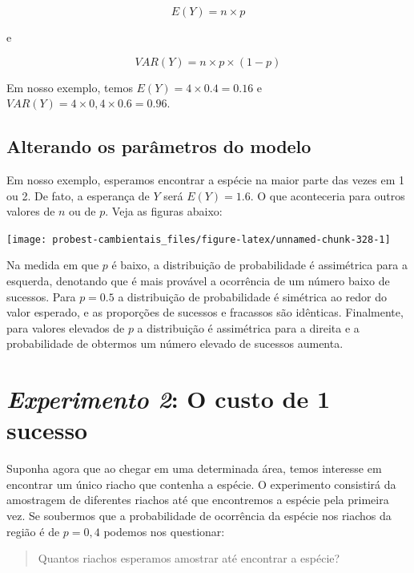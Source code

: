 \documentclass[
]{book}
\begin{document}
\[E(Y) = n \times p\]

e

\[VAR(Y) = n \times p \times (1-p)\]

Em nosso exemplo, temos \(E(Y) = 4 \times 0.4 = 0.16\) e \(VAR(Y) = 4 \times 0,4 \times 0.6 = 0.96\).

\hypertarget{alterando-os-paruxe2metros-do-modelo}{%
\subsection*{Alterando os parâmetros do modelo}\label{alterando-os-paruxe2metros-do-modelo}}

Em nosso exemplo, esperamos encontrar a espécie na maior parte das vezes em 1 ou 2. De fato, a esperança de \(Y\) será \(E(Y) = 1.6\). O que aconteceria para outros valores de \(n\) ou de \(p\). Veja as figuras abaixo:

\begin{center}\texttt{[image: probest-cambientais\_files/figure-latex/unnamed-chunk-328-1]} \end{center}

Na medida em que \(p\) é baixo, a distribuição de probabilidade é assimétrica para a esquerda, denotando que é mais provável a ocorrência de um número baixo de sucessos. Para \(p = 0.5\) a distribuição de probabilidade é simétrica ao redor do valor esperado, e as proporções de sucessos e fracassos são idênticas. Finalmente, para valores elevados de \(p\) a distribuição é assimétrica para a direita e a probabilidade de obtermos um número elevado de sucessos aumenta.

\hypertarget{experimento-2-o-custo-de-1-sucesso}{%
\section{\texorpdfstring{\emph{Experimento 2}: O custo de 1 sucesso}{Experimento 2: O custo de 1 sucesso}}\label{experimento-2-o-custo-de-1-sucesso}}

Suponha agora que ao chegar em uma determinada área, temos interesse em encontrar um único riacho que contenha a espécie. O experimento consistirá da amostragem de diferentes riachos até que encontremos a espécie pela primeira vez. Se soubermos que a probabilidade de ocorrência da espécie nos riachos da região é de \(p = 0,4\) podemos nos questionar:

\begin{quote}
Quantos riachos esperamos amostrar até encontrar a espécie?
\end{quote}
\end{document}
